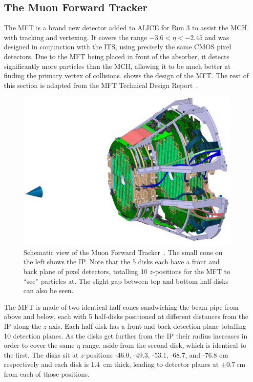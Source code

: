 \subsection{The Muon Forward Tracker}\label{sec:MFT_Theory}
The MFT is a brand new detector added to ALICE for Run 3 to assist the MCH with tracking and vertexing. It covers the range $-3.6<\eta<-2.45$ and was designed in conjunction with the ITS, using precisely the same CMOS pixel detectors. Due to the MFT being placed in front of the absorber, it detects significantly more particles than the MCH, allowing it to be much better at finding the primary vertex of collisions.  shows the design of the MFT. The rest of this section is adapted from the MFT Technical Design Report~\cite{MFT_TDR}. 

\begin{figure}[ht]
    \begin{center}
        \includegraphics[width=.8\textwidth]{Figs/MFT_schematic.jpg}
        \caption[Schematic view of the Muon Forward Tracker]{Schematic view of the Muon Forward Tracker~\cite{MFT_Schematic}. The small cone on the left shows the IP. Note that the 5 disks each have a front and back plane of pixel detectors, totalling 10 $z$-positions for the MFT to ``see'' particles at. The slight gap between top and bottom half-disks can also be seen.}
        \label{fig:MFT Schematic}
    \end{center}
\end{figure}

The MFT is made of two identical half-cones sandwiching the beam pipe from above and below, each with 5 half-disks positioned at different distances from the IP along the $z$-axis. Each half-disk has a front and back detection plane totalling 10 detection planes. As the disks get further from the IP their radius increases in order to cover the same $\eta$ range, aside from the second disk, which is identical to the first. The disks sit at $z$-positions -46.0, -49.3, -53.1, -68.7, and -76.8 \si{\centi\metre} respectively and each disk is \SI{1.4}{\centi\metre} thick, leading to detector planes at $\pm \SI{0.7}{\centi\metre}$ from each of those positions.

